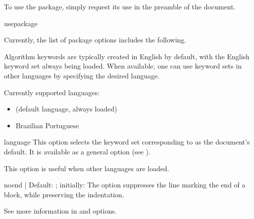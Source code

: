\documentclass[a4paper, 11pt]{article}
\begin{document}
\medskip
To use the package, simply request its use in the preamble of the document.

\begin{Macro*}{usepackage}{}{}
\end{Macro*}

Currently, the list of package options includes the following.

\begin{Option*}{}{}{}
    Algorithm keywords are typically created in English by default, with the English keyword set always being loaded. When available, one can use keyword sets in other languages by specifying the desired language.

    Currently supported languages:
    \begin{itemize}
        \item {} (default language, always loaded)
        \item {} Brazilian Portuguese
    \end{itemize}
\end{Option*}

\begin{PDListing}
    \usepackage[brazilian]{algxpar}
\end{PDListing}

\begin{Optiondef}{language}{}{}
    This option selects the keyword set corresponding to  as the document's default. It is available as a general option (see ).

    This option is useful when other languages are loaded.
\end{Optiondef}

\begin{PDListing}
    \usepackage[brazilian, language = english]{algxpar}
\end{PDListing}

\begin{Optiondef}{noend}{ | }{Default: ; initially: }
    The  option suppresses the line marking the end of a block, while preserving the indentation.

    See more information in  and  options.
\end{Optiondef}
\end{document}
